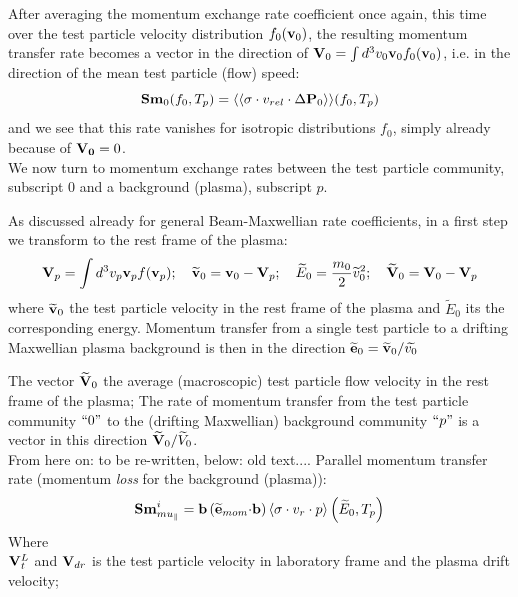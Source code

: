 \documentclass[12pt,dvips]{article}
\begin{document}
After averaging the momentum exchange rate coefficient once again, this time over the test particle velocity distribution $f_0({\bf v}_0)$, the resulting momentum transfer rate
becomes a vector in the direction of ${\bf V}_0 = \int d^3v_0 {\bf v}_0f_0({\bf v}_0)$, i.e. in the direction of the mean test particle (flow) speed:
\begin{equation}
{\bf Sm}_0(f_0,T_p) =\langle\langle \sigma\cdot v_{rel}\cdot \Delta {\bf P}_0\rangle\rangle(f_0,T_p)
\end{equation}
and we see that this rate vanishes for isotropic distributions $f_0$, simply already because of ${\bf V_0} = 0$.
\\

We now turn to momentum exchange rates between the test particle community, subscript $0$ and a background (plasma), subscript $p$.

As discussed already for general Beam-Maxwellian rate coefficients, in a first step we transform to the rest frame of the plasma:
\begin{equation}
{\bf V}_p=\int d^3v_p {\bf v}_p f({\bf v}_p) ;  \quad   \widetilde{{\bf v}}_0= {\bf v}_0 - {\bf V}_p
; \quad \widetilde{E}_0=\frac{m_0}{2} \widetilde{v}_0^2
;  \quad   \widetilde{{\bf V}}_0= {\bf V}_0 - {\bf V}_p
\end{equation}
where $\widetilde{{\bf v}}_0$ the test particle velocity in the rest frame of the plasma and  $\widetilde{E}_0$ its the corresponding energy.
Momentum transfer from a single test particle to a drifting Maxwellian plasma background is then in the direction $\widetilde{{\bf e}}_0=\widetilde{{\bf v}}_0/\widetilde{v_0}$

The vector $\widetilde{{\bf V}}_0$ the average (macroscopic) test particle flow velocity in the rest frame of the plasma;
The rate of momentum transfer from the test particle community $``0"$ to the (drifting Maxwellian) background community $``p"$
is a vector in this direction  $ \widetilde{{\bf V}}_0/\widetilde{V}_0$.\\
From here on: to be re-written, below: old text....
Parallel momentum transfer rate (momentum {\em loss} for the background (plasma)):
$$
{\bf Sm}^i_{mu_\parallel}= {\bf b} \left(\widetilde{{\bf e}}_{mom}{\bf\cdot}{\bf b}\right) \left<\sigma\cdot v_r\cdot p\right>
\left(\widetilde{E}_0 ,T_p\right)
$$
Where\\
${\bf V}^L_t$ and ${\bf V}_{dr}$ is the test particle velocity in laboratory frame and the plasma drift velocity;\\
\end{document}
